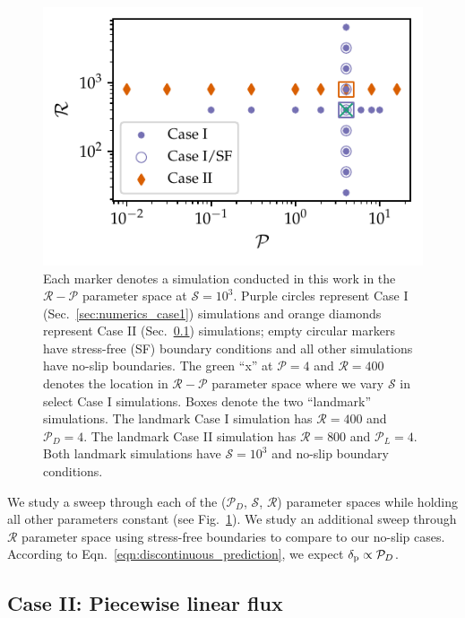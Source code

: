 \documentclass[twocolumn]{aastex631}
\newcommand{\delp}{\ensuremath{\delta_{\rm{p}}}}
\newcommand{\mP}{\ensuremath{\mathcal{P}}}
\newcommand{\mR}{\ensuremath{\mathcal{R}}}
\newcommand{\mS}{\ensuremath{\mathcal{S}}}
\begin{document}
\begin{figure}[t]
\centering
\includegraphics[width=\columnwidth]{parameter_space.pdf}
\caption{
Each marker denotes a simulation conducted in this work in the $\mR-\mP$ parameter space at $\mS = 10^3$. 
Purple circles represent Case I (Sec.~\ref{sec:numerics_case1}) simulations and orange diamonds represent Case II (Sec.~\ref{sec:numerics_case2}) simulations; empty circular markers have stress-free (SF) boundary conditions and all other simulations have no-slip boundaries.
The green ``x'' at $\mP = 4$ and $\mR = 400$ denotes the location in $\mR-\mP$ parameter space where we vary $\mS$ in select Case I simulations.
Boxes denote the two ``landmark'' simulations.
The landmark Case I simulation has $\mR = 400$ and $\mP_D = 4$.
The landmark Case II simulation has $\mR = 800$ and $\mP_L = 4$.
Both landmark simulations have $\mS = 10^3$ and no-slip boundary conditions.
\label{fig:parameter_space}
}
\end{figure}





We study a sweep through each of the ($\mP_D$, $\mS$, $\mR$) parameter spaces while holding all other parameters constant (see Fig.~\ref{fig:parameter_space}).
We study an additional sweep through $\mR$ parameter space using stress-free boundaries to compare to our no-slip cases.
According to Eqn.~\ref{eqn:discontinuous_prediction}, we expect $\delp \propto \mP_D$.


\subsection{Case II: Piecewise linear flux}
\label{sec:numerics_case2}
\end{document}
